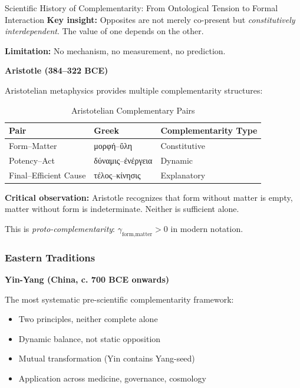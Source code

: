 \begin{chapter}{Scientific History of Complementarity: From Ontological Tension to Formal Interaction}
\textbf{Key insight:} Opposites are not merely co-present but \textit{constitutively interdependent}. The value of one depends on the other.

\textbf{Limitation:} No mechanism, no measurement, no prediction.

\vspace{0.5em}
\textbf{Aristotle (384--322 BCE)}

Aristotelian metaphysics provides multiple complementarity structures:

\begin{table}[h]
\centering
\caption{Aristotelian Complementary Pairs}
\label{tab:aristotle-pairs}
\renewcommand{\arraystretch}{1.2}
\begin{tabular}{@{}lll@{}}
\toprule
\textbf{Pair} & \textbf{Greek} & \textbf{Complementarity Type} \\
\midrule
Form--Matter & \textgreek{μορφή}--\textgreek{ὕλη} & Constitutive \\
Potency--Act & \textgreek{δύναμις}--\textgreek{ἐνέργεια} & Dynamic \\
Final--Efficient Cause & \textgreek{τέλος}--\textgreek{κίνησις} & Explanatory \\
\bottomrule
\end{tabular}
\end{table}

\textbf{Critical observation:} Aristotle recognizes that form without matter is empty, matter without form is indeterminate. Neither is sufficient alone.

This is \textit{proto-complementarity}: $\gamma_{\text{form,matter}} > 0$ in modern notation.

\subsubsection{Eastern Traditions}

\textbf{Yin-Yang (China, c. 700 BCE onwards)}

The most systematic pre-scientific complementarity framework:

\begin{itemize}[noitemsep]
    \item Two principles, neither complete alone
    \item Dynamic balance, not static opposition
    \item Mutual transformation (Yin contains Yang-seed)
    \item Application across medicine, governance, cosmology
\end{itemize}


\end{chapter}

